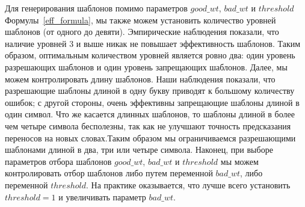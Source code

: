 \documentclass[12pt,a4paper,oneside]{extarticle}
\begin{document}


Для генерирования шаблонов помимо параметров $good\_wt$, $bad\_wt$ и $threshold$ Формулы~\ref{eff_formula}, мы также можем установить количество уровней шаблонов (от одного до девяти). Эмпирические наблюдения показали, что наличие уровней 3 и выше никак не повышает эффективность шаблонов. Таким образом, оптимальным количеством уровней является ровно два: один уровень разрешающих шаблонов и один уровень запрещающих шаблонов. Далее, мы можем контролировать длину шаблонов. Наши наблюдения показали, что разрешающие шаблоны длиной в одну букву приводят к большому количеству ошибок; с другой стороны, очень эффективны запрещающие шаблоны длиной в один символ. Что же касается длинных шаблонов, то шаблоны длиной в более чем четыре символа бесполезны, так как не улучшают точность предсказания переносов на новых словах.Таким образом мы ограничиваемся разрешающими шаблонами длиной в два, три или четыре символа. Наконец, при выборе параметров отбора шаблонов $good\_wt$, $bad\_wt$ и $threshold$ мы можем контролировать отбор шаблонов либо путем переменной $bad\_wt$, либо переменной $threshold$. На практике оказывается, что лучше всего установить $threshold = 1$ и увеличивать параметр $bad\_wt$.
\end{document}
